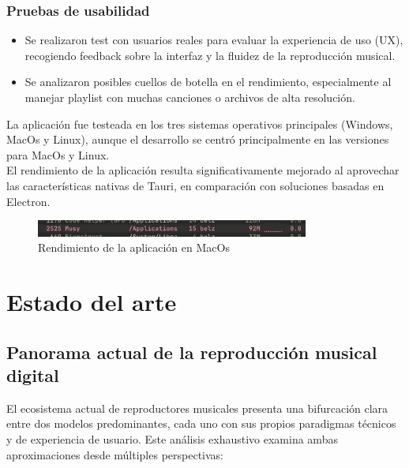 \documentclass[11pt, a4paper]{article}
\begin{document}
            \subsubsection{Pruebas de usabilidad}

            \begin{itemize}
                \item Se realizaron test con usuarios reales para evaluar la experiencia de uso (UX), recogiendo feedback sobre la interfaz y la fluidez de la reproducción musical.
                \item Se analizaron posibles cuellos de botella en el rendimiento, especialmente al manejar playlist con muchas canciones o archivos de alta resolución.
            \end{itemize}

        La aplicación fue testeada en los tres sistemas operativos principales (Windows, MacOs y Linux), aunque el desarrollo se centró principalmente en las versiones para MacOs y Linux. \\

        El rendimiento de la aplicación resulta significativamente mejorado al aprovechar las características nativas de Tauri, en comparación con soluciones basadas en Electron. \\

        \begin{figure}[h!]
            \centering
            \includegraphics[width=0.8\textwidth]{media/imagemusyram.png}
            \caption{Rendimiento de la aplicación en MacOs}
            \label{fig:ejemplo}
        \end{figure}

\section{Estado del arte}

  \subsection{Panorama actual de la reproducción musical digital}

  El ecosistema actual de reproductores musicales presenta una bifurcación clara entre dos modelos predominantes, cada uno con sus propios paradigmas técnicos y de experiencia de usuario. Este análisis exhaustivo examina ambas aproximaciones desde múltiples perspectivas:
\end{document}
